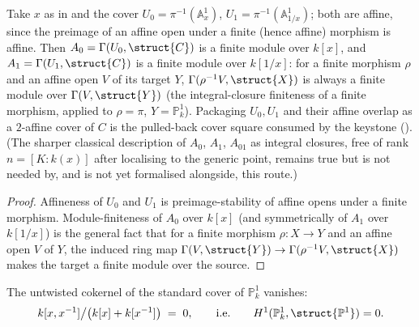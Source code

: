 \begin{proposition}
  \label{thm:adelic_chart_finite_over_P1}
  \leanok
  Take \(x\) as in  and the
  cover \(U_0 = \pi^{-1}(\mathbb{A}^1_x)\),
  \(U_1 = \pi^{-1}(\mathbb{A}^1_{1/x})\); both are affine, since the
  preimage of an affine open under a finite (hence affine) morphism is
  affine. Then \(A_0 = \Gamma(U_0, \struct{C})\) is a finite module over
  \(k[x]\), and \(A_1 = \Gamma(U_1, \struct{C})\) is a finite module over
  \(k[1/x]\): for a finite morphism \(\rho\) and an affine open \(V\) of
  its target \(Y\), \(\Gamma(\rho^{-1}V, \struct{X})\) is always a finite
  module over \(\Gamma(V, \struct{Y})\) (the integral-closure finiteness
  of a finite morphism, applied to \(\rho = \pi\), \(Y = \mathbb{P}^1_k\)).
  Packaging \(U_0, U_1\) and their affine overlap as a
  \(2\)-affine cover of \(C\) is the pulled-back cover square consumed by
  the keystone (). (The
  sharper classical description of \(A_0\), \(A_1\), \(A_{01}\) as
  integral closures, free of rank \(n = [K:k(x)]\) after localising to
  the generic point, remains true but is not needed by, and is not yet
  formalised alongside, this route.)
\end{proposition}
\begin{proof}
  \leanok
  Affineness of \(U_0\) and \(U_1\) is preimage-stability of affine opens
  under a finite morphism. Module-finiteness of \(A_0\) over \(k[x]\)
  (and symmetrically of \(A_1\) over \(k[1/x]\)) is the general fact that
  for a finite morphism \(\rho \colon X \to Y\) and an affine open \(V\)
  of \(Y\), the induced ring map \(\Gamma(V, \struct{Y}) \to
  \Gamma(\rho^{-1}V, \struct{X})\) makes the target a finite module over
  the source.
\end{proof}
\begin{lemma}
  \label{thm:adelic_cokernel_P1_zero}
  The untwisted cokernel of the standard cover of \(\mathbb{P}^1_k\)
  vanishes:
  \[
    k[x, x^{-1}] \big/ \bigl(k[x] + k[x^{-1}]\bigr) \;=\; 0,
    \qquad\text{i.e.}\qquad H^1(\mathbb{P}^1_k, \struct{\mathbb{P}^1}) = 0.
  \]
\end{lemma}
